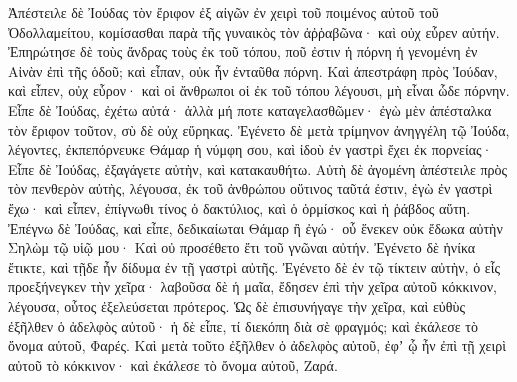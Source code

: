 {Ἀπέστειλε δὲ Ἰούδας τὸν ἔριφον ἐξ αἰγῶν ἐν χειρὶ τοῦ ποιμένος αὐτοῦ τοῦ Ὀδολλαμείτου, κομίσασθαι παρὰ τῆς γυναικὸς τὸν ἀῤῥαβῶνα· καὶ οὐχ εὗρεν αὐτήν.
Ἐπηρώτησε δὲ τοὺς ἄνδρας τοὺς ἐκ τοῦ τόπου, ποῦ ἐστιν ἡ πόρνη ἡ γενομένη ἐν Αἰνὰν ἐπὶ τῆς ὁδοῦ; καὶ εἶπαν, οὐκ ἦν ἐνταῦθα πόρνη.
Καὶ ἀπεστράφη πρὸς Ἰούδαν, καὶ εἶπεν, οὐχ εὗρον· καὶ οἱ ἄνθρωποι οἱ ἐκ τοῦ τόπου λέγουσι, μὴ εἶναι ὧδε πόρνην.
Εἶπε δὲ Ἰούδας, ἐχέτω αὐτά· ἀλλὰ μή ποτε καταγελασθῶμεν· ἐγὼ μὲν ἀπέσταλκα τὸν ἔριφον τοῦτον, σὺ δὲ οὐχ εὕρηκας.
Ἐγένετο δὲ μετὰ τρίμηνον ἀνηγγέλη τῷ Ἰούδα, λέγοντες, ἐκπεπόρνευκε Θάμαρ ἡ νύμφη σου, καὶ ἰδοὺ ἐν γαστρὶ ἔχει ἐκ πορνείας· Εἶπε δὲ Ἰούδας, ἐξαγάγετε αὐτὴν, καὶ κατακαυθήτω.
Αὐτὴ δὲ ἀγομένη ἀπέστειλε πρὸς τὸν πενθερὸν αὐτὴς, λέγουσα, ἐκ τοῦ ἀνθρώπου οὕτινος ταῦτά ἐστιν, ἐγὼ ἐν γαστρὶ ἔχω· καὶ εἶπεν, ἐπίγνωθι τίνος ὁ δακτύλιος, καὶ ὁ ὁρμίσκος καὶ ἡ ῥάβδος αὕτη.
Ἐπέγνω δὲ Ἰούδας, καὶ εἶπε, δεδικαίωται Θάμαρ ἢ ἐγώ· οὗ ἕνεκεν οὐκ ἔδωκα αὐτὴν Σηλὼμ τῷ υἱῷ μου· Καὶ οὐ προσέθετο ἔτι τοῦ γνῶναι αὐτήν.
Ἐγένετο δὲ ἡνίκα ἔτικτε, καὶ τῇδε ἦν δίδυμα ἐν τῇ γαστρὶ αὐτῆς.
Ἐγένετο δὲ ἐν τῷ τίκτειν αὐτὴν, ὁ εἷς προεξήνεγκεν τὴν χεῖρα· λαβοῦσα δὲ ἡ μαῖα, ἔδησεν ἐπὶ τὴν χεῖρα αὐτοῦ κόκκινον, λέγουσα, οὗτος ἐξελεύσεται πρότερος.
Ὡς δὲ ἐπισυνήγαγε τὴν χεῖρα, καὶ εὐθὺς ἐξῆλθεν ὁ ἀδελφὸς αὐτοῦ· ἡ δὲ εἶπε, τί διεκόπη διὰ σὲ φραγμός; καὶ ἐκάλεσε τὸ ὄνομα αὐτοῦ, Φαρές.
Καὶ μετὰ τοῦτο ἐξῆλθεν ὁ ἀδελφὸς αὐτοῦ, ἐφʼ ᾧ ἦν ἐπὶ τῇ χειρὶ αὐτοῦ τὸ κόκκινον· καὶ ἐκάλεσε τὸ ὄνομα αὐτοῦ, Ζαρά.

}
